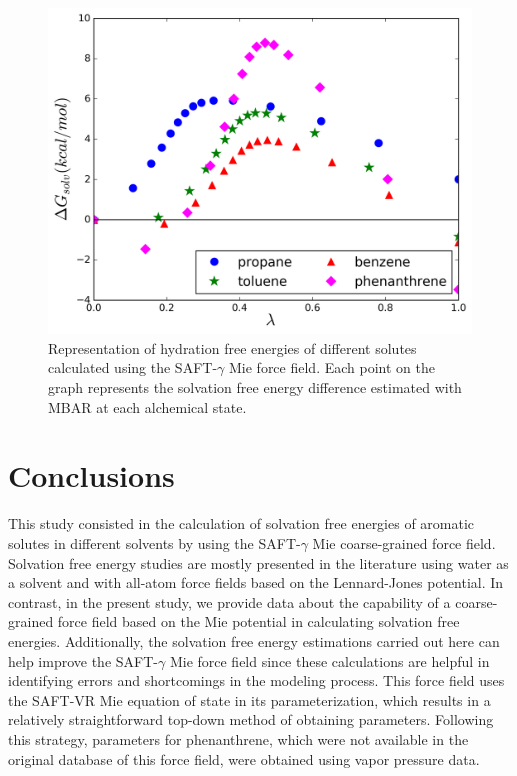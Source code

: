 \documentclass[preprint]{elsarticle}
\begin{document}
	\begin{figure}
		\centering
		\includegraphics[width=1.0\linewidth]{Figures/waterart}
		\caption{Representation of hydration free energies of different solutes calculated using the SAFT-$\gamma$ Mie force field. Each point on the graph represents the solvation free energy difference estimated with MBAR at each alchemical state.}
		\label{fig:water}
	\end{figure}
	
	\section{Conclusions}

	This study consisted in the calculation of solvation free energies of aromatic solutes in different solvents by using the SAFT-$\gamma$ Mie coarse-grained force field. Solvation free energy studies are mostly presented in the literature using water as a solvent and with all-atom force fields based on the Lennard-Jones potential. In contrast, in the present study, we provide data about the capability of a coarse-grained force field based on the Mie potential in calculating solvation free energies. Additionally, the solvation free energy estimations carried out here can help improve the SAFT-$\gamma$ Mie force field since these calculations are helpful in identifying errors and shortcomings in the modeling process. This force field uses the SAFT-VR Mie equation of state in its parameterization, which results in a relatively straightforward top-down method of obtaining parameters. Following this strategy, parameters for phenanthrene, which were not available in the original database of this force field, were obtained using vapor pressure data.
\end{document}
